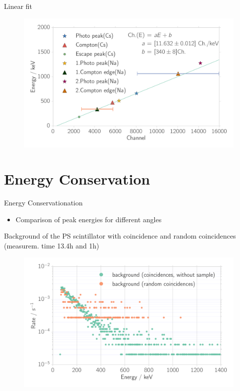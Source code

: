 \documentclass[xcolor=x11names,compress]{beamer}
\renewcommand{\(}{\begin{columns}}
\renewcommand{\)}{\end{columns}}
\newcommand{\<}[1]{\begin{column}{#1}}
\renewcommand{\>}{\end{column}}
\begin{document}
\begin{frame}[t]{Linear fit}
 \begin{figure}[htpb]
    \centering
    \includegraphics[width=1.0\linewidth]{../analysis/figures/calibration_na_linear_fit}
    \label{fig:calibration_na_linear_fit}
\end{figure}
   
\end{frame}
\section{Energy Conservation}
\begin{frame}[t]{Energy Conservationation}
    \begin{itemize}
        \item Comparison of peak energies for different angles
    \end{itemize}
\end{frame}
\begin{frame}[t]{Background of the PS scintillator with coincidence
    and random coincidences (measurem. time 13.4h and 1h)}
    \begin{figure}[htpb]
    \centering
    \includegraphics[width=1.0\linewidth]{../analysis/figures/coin_background_random}
    \label{fig:coin_ps_background}
\end{figure}

\end{frame}
\end{document}
